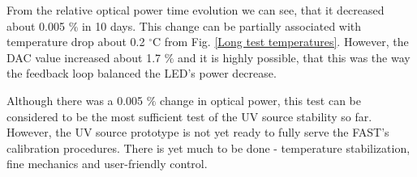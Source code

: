 From the relative optical power time evolution we can see, that it decreased about 0.005 $\%$ in 10 days. This change can be partially associated with temperature drop about 0.2 $^\circ$C from Fig. \ref{Long test temperatures}. However, the DAC value increased about 1.7 $\%$ and it is highly possible, that this was the way the feedback loop balanced the LED's power decrease.

\par 
 
Although there was a 0.005 $\%$ change in optical power, this test can be considered to be the most sufficient test of the UV source stability so far. However, the UV source prototype is not yet ready to fully serve the FAST's calibration procedures. There is yet much to be done - temperature stabilization, fine mechanics and user-friendly control.





